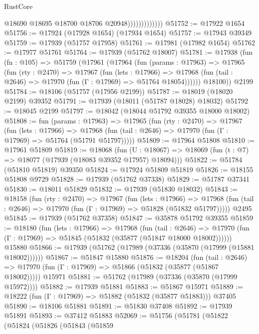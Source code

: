 \begin{lexlean}{RustCore}
\begin{coremodule}
                              @18690
                              @18695
                              @18700
                              @18706
                              @20948)))))))))))))
@51752 := @17922 @1654
@51756 := @17924 (@17928 @1654) (@17934 @1654)
@51757 := @17943 @39349
@51759 := @17939 (@51757 @17958)
@51761 := @17981 (@17982 @1654)
@51762 := @17977 @51761
@51764 := @17939 (@51762 @18007)
@51781 := @17938
    (fun (fn : @105) =>
    @51759
      (@17961
        (@17964
          (fun (params : @17963) =>
          @17965
            (fun (rty : @2470) =>
            @17967
              (fun (lets : @17966) =>
              @17968 (fun (tail : @2646) => @17970 (fun (Γ : @17969) => @51764 @18054))))))
        @18100))
    @2199
@51784 := @18106 (@51757 (@17956 @2199))
@51787 := @18019 (@18020 @2199) @39352
@51791 := @17939 (@18011 (@51787 @18028) @18032)
@51792 := @18045 @2199
@51797 := @18042 (@18044 @51792 @39355 @18000 @18002)
@51808 := fun (params : @17963) =>
  @17965
    (fun (rty : @2470) =>
    @17967
      (fun (lets : @17966) =>
      @17968 (fun (tail : @2646) => @17970 (fun (Γ : @17969) => @51764 (@51791 @51797)))))
@51809 := @17964 @51808
@51810 := @17961 @51809
@51819 := @18068
    (fun (U : @18067) => @18069 (fun (t : @7) => @18077 (@17939 (@18083 @39352 @17957) @18094)))
@51822 := @51784 (@51810 @51819) @39350
@51824 := @17924 @51809 @51819
@51826 := @18155 @51808 @9729
@51828 := @17939 (@51762 @37338)
@51829 := @51787 @37341
@51830 := @18011 @51829
@51832 := @17939 (@51830 @18032)
@51843 := @18158
    (fun (rty : @2470) =>
    @17967
      (fun (lets : @17966) =>
      @17968 (fun (tail : @2646) => @17970 (fun (Γ : @17969) => @51828 (@51832 @51797)))))
    @2495
@51845 := @17939 (@51762 @37358)
@51847 := @35878 @51792 @39355
@51859 := @18180
    (fun (lets : @17966) =>
    @17968
      (fun (tail : @2646) =>
      @17970 (fun (Γ : @17969) => @51845 (@51832 (@35877 (@51847 @18000 @18002))))))
    @15880
@51866 := @17939 (@51762 (@17989 (@37336 (@35870 (@17999 (@15881 @18002))))))
@51867 := @51847 @15880
@51876 := @18204
    (fun (tail : @2646) => @17970 (fun (Γ : @17969) => @51866 (@51832 (@35877 (@51867 @18002)))))
    @15971
@51881 := @51762 (@17989 (@37336 (@35870 (@17999 @15972))))
@51882 := @17939 @51881
@51883 := @51867 @15971
@51889 := @18222 (fun (Γ : @17969) => @51882 (@51832 (@35877 @51883))) @37405
@51890 := @18106 @51881
@51891 := @51830 @37408
@51892 := @17939 @51891
@51893 := @37412 @51883
@52069 := @51756
    (@51781
      (@51822
        (@51824
          (@51826
            (@51843
              (@51859

\end{coremodule}
\end{lexlean}

